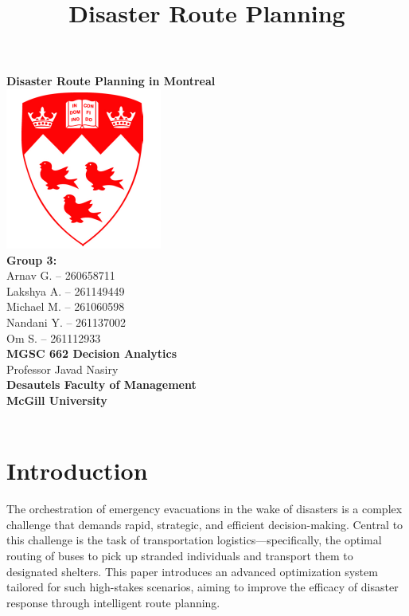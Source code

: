 \documentclass[12pt]{article}
\title{Disaster Route Planning}
\author{} %
\date{} %
\begin{document}
\begin{titlepage}
   \centering
   \vspace*{1 cm}
   \textbf{\Large Disaster Route Planning in Montreal}\\[2 cm] %
   \includegraphics[scale=0.5]{mcgill_logo.png}\\[1 cm] %
   \textbf{Group 3:}\\[0.5 cm]
   Arnav G. -- 260658711\\
   Lakshya A. -- 261149449\\
   Michael M. -- 261060598\\
   Nandani Y. -- 261137002\\
   Om S. -- 261112933\\[1 cm]
   \textbf{MGSC 662 Decision Analytics}\\[0.5 cm]
   Professor Javad Nasiry\\[1 cm]
   \textbf{Desautels Faculty of Management}\\
    \textbf{McGill University}\\[2 cm]
    \textcolor{red}{\hrulefill}\\[0.5 cm]
\end{titlepage}


\tableofcontents
\newpage


\section{Introduction}
The orchestration of emergency evacuations in the wake of disasters is a complex challenge that demands rapid, strategic, and efficient decision-making. Central to this challenge is the task of transportation logistics—specifically, the optimal routing of buses to pick up stranded individuals and transport them to designated shelters. This paper introduces an advanced optimization system tailored for such high-stakes scenarios, aiming to improve the efficacy of disaster response through intelligent route planning.
\end{document}

